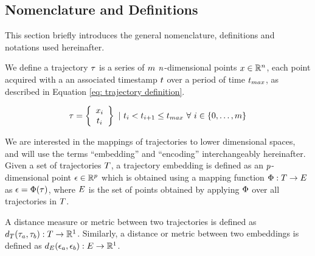 \subsection{Nomenclature and Definitions}\label{subsec: nomenclature and definitions}

This section briefly introduces the general nomenclature, definitions and notations used hereinafter.

We define a trajectory $\tau$ is a series of $m$ $n$-dimensional points $x\in\mathbb{R}^{n}$, each point acquired with a an associated timestamp $t$ over a period of time $t_{max}$, as described in Equation \ref{eq: trajectory definition}.

\begin{equation}\label{eq: trajectory definition}
	\tau = 
	\left\{
	\begin{array}{c}
		x_i \\
		t_i
	\end{array}
	\right\}
	~|~ t_i < t_{i+1} \leq t_{max} ~\forall~ i \in \{0, \hdots, m\}
\end{equation}

We are interested in the mappings of trajectories to lower dimensional spaces, and will use the terms ``embedding'' and ``encoding'' interchangeably hereinafter.
%
Given a set of trajectories $T$, a trajectory embedding is defined as an $p$-dimensional point $\epsilon\in\mathbb{R}^{p}$ which is obtained using a mapping function $\Phi:T\rightarrow E$ as $\epsilon = \Phi(\tau)$, where $E$ is the set of points obtained by applying $\Phi$ over all trajectories in $T$.

A distance measure or metric between two trajectories is defined as $d_{T}(\tau_a, \tau_b):T\rightarrow\mathbb{R}^{1}$.
%
Similarly, a distance or metric between two embeddings is defined as $d_{E}(\epsilon_a, \epsilon_b):E\rightarrow\mathbb{R}^{1}$.
